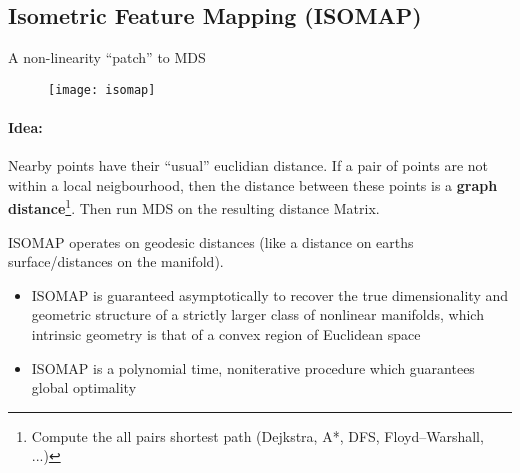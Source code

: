 
\subsection*{Isometric Feature Mapping (ISOMAP)}
A non-linearity ``patch'' to MDS

\begin{figure}[H]
	\centering
	\texttt{[image: isomap]}
\end{figure}

\paragraph{Idea:} Nearby points have their ``usual'' euclidian distance. If a pair of points are not within a local neigbourhood, then the distance between these points is a \textbf{graph distance}\footnote{Compute the all pairs shortest path (Dejkstra, A*,  DFS, Floyd–Warshall, ...)}. Then run MDS on the resulting distance Matrix.

ISOMAP operates on geodesic distances (like a distance on earths surface/distances on the manifold).

\begin{itemize}
	\item ISOMAP is guaranteed asymptotically to recover the true dimensionality and geometric structure of a strictly larger class of nonlinear manifolds, which intrinsic geometry is that of a convex region of Euclidean space
	\item ISOMAP is a polynomial time, noniterative procedure which guarantees global optimality
\end{itemize}

